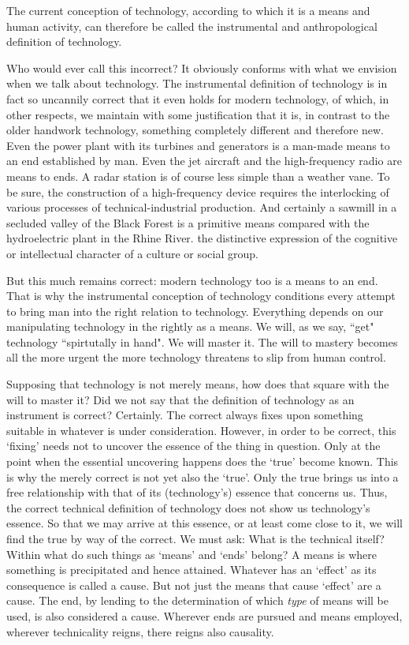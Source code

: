 \documentclass[12pt]{article}
\begin{document}
The current conception of technology, according to which it is a means and human activity, can therefore be called the instrumental and anthropological definition of technology.

Who would ever call this incorrect? It obviously conforms with what we envision when we talk about technology. The instrumental definition of technology is in fact so uncannily correct that it even holds for modern technology, of which, in other respects, we maintain with some justification that it is, in contrast to the older handwork technology, something completely different and therefore new. Even the power plant with its turbines and generators is a man-made means to an end established by man. Even the jet aircraft and the high-frequency radio are means to ends. A radar station is of course less simple than a weather vane. To be sure, the construction of a high-frequency device requires the interlocking of various processes of technical-industrial production. And certainly a sawmill in a secluded valley of the Black Forest is a primitive means compared with the hydroelectric plant in the Rhine River.
the distinctive expression of the cognitive or intellectual character of a culture or social group.

But this much remains correct: modern technology too is a means to an end. That is why the instrumental conception of technology conditions every attempt to bring man into the right relation to technology. Everything depends on our manipulating technology in the rightly as a means. We will, as we say, ``get" technology ``spirtutally in hand". We will master it. The will to mastery becomes all the more urgent the more technology threatens to slip from human control.

Supposing that technology is not merely means, how does that square with the will to master it? Did we not say that the definition of technology as an instrument is correct? Certainly. The correct always fixes upon something suitable in whatever is under consideration. However, in order to be correct, this `fixing' needs not to uncover the essence of the thing in question. Only at the point when the essential uncovering happens does the `true' become known. This is why the merely correct is not yet also the `true'. Only the true brings us into a free relationship with that of its (technology's) essence that concerns us. Thus, the correct technical definition of technology does not show us technology's essence. So that we may arrive at this essence, or at least come close to it, we will find the true by way of the correct. We must ask: What is the technical itself? Within what do such things as `means' and `ends' belong? A means is where something is precipitated and hence attained. Whatever has an `effect' as its consequence is called a cause. But not just the means that cause `effect' are a cause. The end, by lending to the determination of which \textit{type} of means will be used, is also considered a cause. Wherever ends are pursued and means employed, wherever technicality reigns, there reigns also causality.
\end{document}
